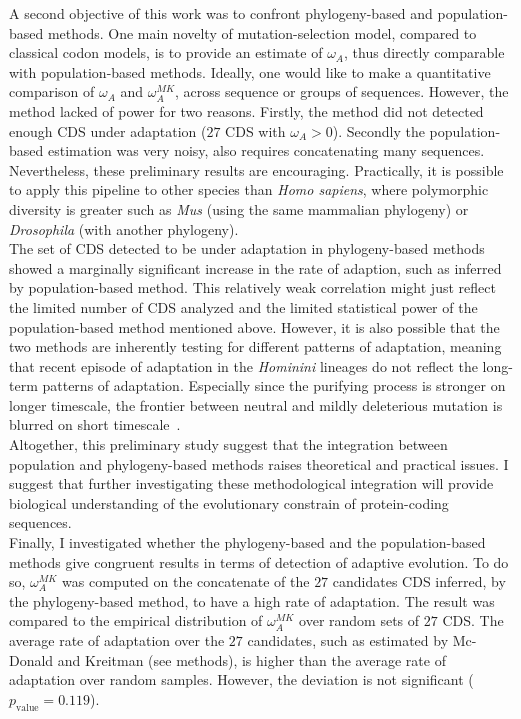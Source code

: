 A second objective of this work was to confront phylogeny-based and population-based methods. One main novelty of mutation-selection model, compared to classical \gls{codon} models, is to provide an estimate of $\omega_A$, thus directly comparable with population-based methods. Ideally, one would like to make a quantitative comparison of $\omega_A$ and $\omega_A^{MK}$, across sequence or groups of sequences. However, the method lacked of power for two reasons. Firstly, the method did not detected enough CDS under adaptation ($27$ CDS with $\omega_A > 0$). Secondly the population-based estimation was very noisy, also requires concatenating many sequences. Nevertheless, these preliminary results are encouraging. Practically, it is possible to apply this pipeline to other species than \textit{Homo sapiens}, where \gls{polymorphic} diversity is greater such as \textit{Mus} (using the same mammalian phylogeny) or \textit{Drosophila} (with another phylogeny). \\

The set of CDS detected to be under adaptation in phylogeny-based methods showed a marginally significant increase in the rate of adaption, such as inferred by population-based method. This relatively weak correlation might just reflect the limited number of CDS analyzed and the limited statistical power of the population-based method mentioned above. However, it is also possible that the two methods are inherently testing for different patterns of adaptation, meaning that recent episode of adaptation in the \textit{Hominini} lineages do not reflect the long-term patterns of adaptation. Especially since the purifying process is stronger on longer timescale, the frontier between \gls{neutral} and mildly deleterious mutation is blurred on short timescale~\citep{ho_time_2005}. \\

Altogether, this preliminary study suggest that the integration between population and phylogeny-based methods raises theoretical and practical issues. I suggest that further investigating these methodological integration will provide biological understanding of the evolutionary constrain of protein-coding sequences. \\

Finally, I investigated whether the phylogeny-based and the population-based methods give congruent results in terms of detection of adaptive evolution.
To do so, $\omega_A^{MK}$ was computed on the concatenate of the $27$ candidates CDS inferred, by the phylogeny-based method, to have a high rate of adaptation. The result was compared to the empirical distribution of $\omega_A^{MK}$ over random sets of $27$ CDS.
The average rate of adaptation over the $27$ candidates, such as estimated by Mc-Donald and Kreitman (see methods), is higher than the average rate of adaptation over random samples. However, the deviation is not significant ($p_{\mathrm{value}}=0.119$).\\


